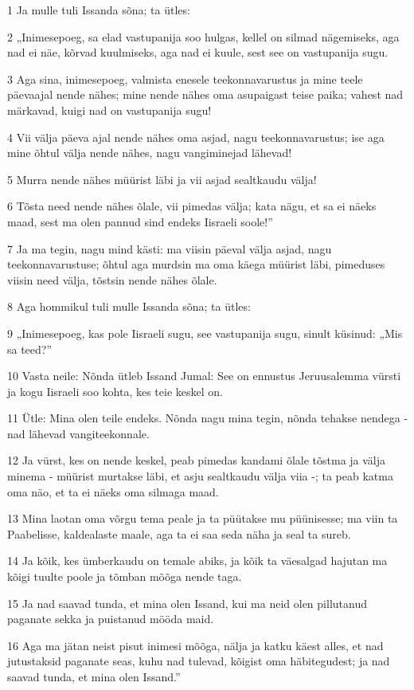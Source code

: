 \par 1 Ja mulle tuli Issanda sõna; ta ütles:
\par 2 „Inimesepoeg, sa elad vastupanija soo hulgas, kellel on silmad nägemiseks, aga nad ei näe, kõrvad kuulmiseks, aga nad ei kuule, sest see on vastupanija sugu.
\par 3 Aga sina, inimesepoeg, valmista enesele teekonnavarustus ja mine teele päevaajal nende nähes; mine nende nähes oma asupaigast teise paika; vahest nad märkavad, kuigi nad on vastupanija sugu!
\par 4 Vii välja päeva ajal nende nähes oma asjad, nagu teekonnavarustus; ise aga mine õhtul välja nende nähes, nagu vangiminejad lähevad!
\par 5 Murra nende nähes müürist läbi ja vii asjad sealtkaudu välja!
\par 6 Tõsta need nende nähes õlale, vii pimedas välja; kata nägu, et sa ei näeks maad, sest ma olen pannud sind endeks Iisraeli soole!”
\par 7 Ja ma tegin, nagu mind kästi: ma viisin päeval välja asjad, nagu teekonnavarustuse; õhtul aga murdsin ma oma käega müürist läbi, pimeduses viisin need välja, tõstsin nende nähes õlale.
\par 8 Aga hommikul tuli mulle Issanda sõna; ta ütles:
\par 9 „Inimesepoeg, kas pole Iisraeli sugu, see vastupanija sugu, sinult küsinud: „Mis sa teed?”
\par 10 Vasta neile: Nõnda ütleb Issand Jumal: See on ennustus Jeruusalemma vürsti ja kogu Iisraeli soo kohta, kes teie keskel on.
\par 11 Ütle: Mina olen teile endeks. Nõnda nagu mina tegin, nõnda tehakse nendega - nad lähevad vangiteekonnale.
\par 12 Ja vürst, kes on nende keskel, peab pimedas kandami õlale tõstma ja välja minema - müürist murtakse läbi, et asju sealtkaudu välja viia -; ta peab katma oma näo, et ta ei näeks oma silmaga maad.
\par 13 Mina laotan oma võrgu tema peale ja ta püütakse mu püünisesse; ma viin ta Paabelisse, kaldealaste maale, aga ta ei saa seda näha ja seal ta sureb.
\par 14 Ja kõik, kes ümberkaudu on temale abiks, ja kõik ta väesalgad hajutan ma kõigi tuulte poole ja tõmban mõõga nende taga.
\par 15 Ja nad saavad tunda, et mina olen Issand, kui ma neid olen pillutanud paganate sekka ja puistanud mööda maid.
\par 16 Aga ma jätan neist pisut inimesi mõõga, nälja ja katku käest alles, et nad jutustaksid paganate seas, kuhu nad tulevad, kõigist oma häbitegudest; ja nad saavad tunda, et mina olen Issand.”
